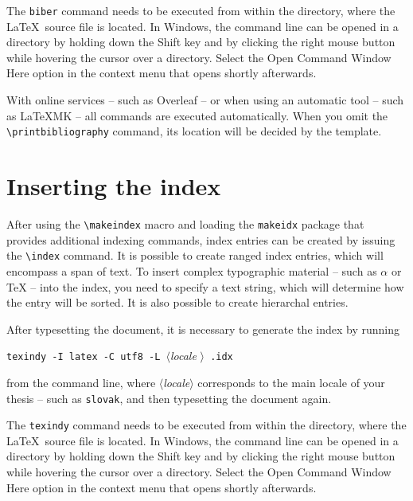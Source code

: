 \documentclass[
  digital, %
  table,   %
  lof,     %
  lot,     %
]{fithesis3}
\begin{document}
The \texttt{biber} command needs to be executed from within the
directory, where the \LaTeX\ source file is located. In Windows,
the command line can be opened in a directory by holding down the
\textsf{Shift} key and by clicking the right mouse button while
hovering the cursor over a directory.  Select the \textsf{Open
Command Window Here} option in the context menu that opens shortly
afterwards.

With online services -- such as Overleaf -- or when using an
automatic tool -- such as \LaTeX MK -- all commands are executed
automatically. When you omit the \verb"\printbibliography" command,
its location will be decided by the template.

  \printbibliography[heading=bibintoc] %

\chapter{Inserting the index}
After using the \verb"\makeindex" macro and loading the
\texttt{makeidx} package that provides additional indexing
commands, index entries can be created by issuing the \verb"\index"
command. It is possible to create ranged index
entries, which will encompass a span of text.
To insert complex typographic material -- such as $\alpha$
 or \TeX{}  --
into the index, you need to specify a text string, which will
determine how the entry will be sorted. It is also possible to
create hierarchal entries. 

After typesetting the document, it is necessary to generate the
index by running
\begin{center}%
  \texttt{texindy -I latex -C utf8 -L }$\langle$\textit{locale}%
  $\rangle$\texttt{ \jobname.idx}
\end{center}
from the command line, where $\langle$\textit{locale}$\rangle$
corresponds to the main locale of your thesis -- such as
\texttt{slovak}, and then typesetting the document again.

The \texttt{texindy} command needs to be executed from within the
directory, where the \LaTeX\ source file is located. In Windows,
the command line can be opened in a directory by holding down the
\textsf{Shift} key and by clicking the right mouse button while
hovering the cursor over a directory. Select the \textsf{Open Command
Window Here} option in the context menu that opens shortly
afterwards.
\end{document}
